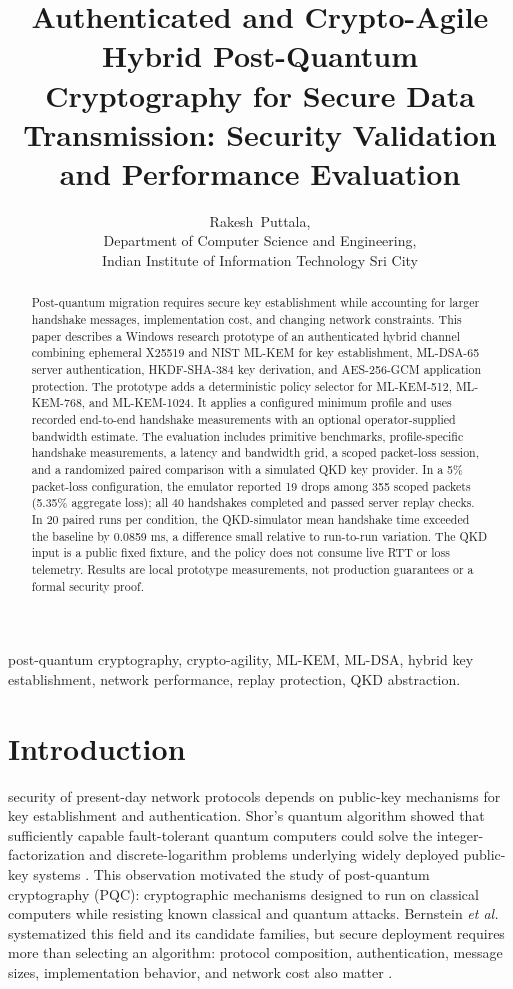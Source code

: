 \documentclass[journal]{IEEEtran}
\title{Authenticated and Crypto-Agile Hybrid Post-Quantum Cryptography for Secure Data Transmission: Security Validation and Performance Evaluation}
\author{Rakesh~Puttala,\\
Department of Computer Science and Engineering,\\
Indian Institute of Information Technology Sri City\\
}
\begin{document}
\maketitle

\begin{abstract}
Post-quantum migration requires secure key establishment while accounting for larger handshake messages, implementation cost, and changing network constraints. This paper describes a Windows research prototype of an authenticated hybrid channel combining ephemeral X25519 and NIST ML-KEM for key establishment, ML-DSA-65 server authentication, HKDF-SHA-384 key derivation, and AES-256-GCM application protection. The prototype adds a deterministic policy selector for ML-KEM-512, ML-KEM-768, and ML-KEM-1024. It applies a configured minimum profile and uses recorded end-to-end handshake measurements with an optional operator-supplied bandwidth estimate. The evaluation includes primitive benchmarks, profile-specific handshake measurements, a latency and bandwidth grid, a scoped packet-loss session, and a randomized paired comparison with a simulated QKD key provider. In a 5\% packet-loss configuration, the emulator reported 19 drops among 355 scoped packets (5.35\% aggregate loss); all 40 handshakes completed and passed server replay checks. In 20 paired runs per condition, the QKD-simulator mean handshake time exceeded the baseline by 0.0859 ms, a difference small relative to run-to-run variation. The QKD input is a public fixed fixture, and the policy does not consume live RTT or loss telemetry. Results are local prototype measurements, not production guarantees or a formal security proof.
\end{abstract}

\begin{IEEEkeywords}
post-quantum cryptography, crypto-agility, ML-KEM, ML-DSA, hybrid key establishment, network performance, replay protection, QKD abstraction.
\end{IEEEkeywords}

\section{Introduction}
 security of present-day network protocols depends on public-key mechanisms for key establishment and authentication. Shor's quantum algorithm showed that sufficiently capable fault-tolerant quantum computers could solve the integer-factorization and discrete-logarithm problems underlying widely deployed public-key systems \cite{shor1994}. This observation motivated the study of post-quantum cryptography (PQC): cryptographic mechanisms designed to run on classical computers while resisting known classical and quantum attacks. Bernstein \emph{et al.} systematized this field and its candidate families, but secure deployment requires more than selecting an algorithm: protocol composition, authentication, message sizes, implementation behavior, and network cost also matter \cite{bernstein2009}.
\end{document}

